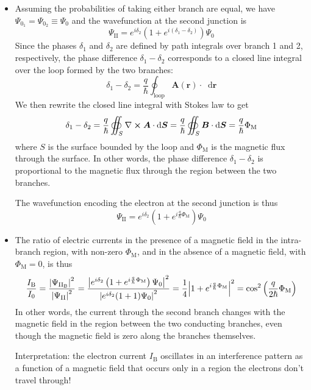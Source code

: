 \documentclass[11pt, a4paper]{article}
\newcommand{\diff}{\mathop{}\!\mathrm{d}} %
\renewcommand{\curl}{\nabla \cross}
\renewcommand{\vec}[1]{\bm{#1}}  %
\renewcommand{\r}{\vec{r}}  %
\newcommand{\A}{\vec{A}}  %
\newcommand{\B}{\vec{B}}  %
\renewcommand{\P}{\Psi}  %
\begin{document}
\begin{itemize}
	\item Assuming the probabilities of taking either branch are equal, we have $ \P_{0_{1}} = \P_{0_{2}} \equiv \P_{0} $ and the wavefunction at the second junction is
	\begin{equation*}
		\P_{\text{II}} = e^{i\delta_{2}}\left(1 + e^{i(\delta_{1} - \delta_{2})}\right)\P_{0}
	\end{equation*}
	Since the phases $ \delta_{1} $ and $\delta_{2} $ are defined by path integrals over branch 1 and 2, respectively, the phase difference $ \delta_{1} - \delta_{2} $ corresponds to a closed line integral over the loop formed by the two branches:
	\begin{equation*}
		\delta_{1} - \delta_{2} = \frac{q}{\hbar} \oint_{\text{loop}} \A(\r) \cdot \diff \r
	\end{equation*}
	We then rewrite the closed line integral with Stokes law to get
	\begin{equation*}
		\delta_{1} - \delta_{2} = \frac{q}{\hbar} \oiint_{S}\curl \A \cdot \diff \vec{S} = \frac{q}{\hbar}\oiint_{S} \B \cdot \diff \vec{S} = \frac{q}{\hbar}\Phi_{\text{M}}
	\end{equation*}
	where $ S $ is the surface bounded by the loop and $ \Phi_{\text{M}} $ is the magnetic flux through the surface. In other words, the phase difference $ \delta_{1} - \delta_{2} $ is proportional to the magnetic flux through the region between the two branches.
	
	The wavefunction encoding the electron at the second junction is thus
	\begin{equation*}
		\P_{\text{II}} = e^{i\delta_{2}}\left(1 + e^{i\frac{q}{\hbar}\Phi_{\text{M}}}\right)\P_{0}
	\end{equation*}
	
	\item The ratio of electric currents in the presence of a magnetic field in the intra-branch region, with non-zero $ \Phi_{\text{M}} $, and in the absence of a magnetic field, with $ \Phi_{\text{M}} = 0 $, is thus
	\begin{equation*}
		\frac{I_{\text{B}}}{I_{0}} = \frac{\abs{\P_{\text{II}_{\text{B}}}}^{2}}{\abs{\P_{\text{II}}}^{2}} = \frac{\abs{e^{i\delta_{2}}\left(1 + e^{i\frac{q}{\hbar}\Phi_{\text{M}}}\right)\P_{0}}^{2}}{\abs{e^{i\delta_{2}}(1 + 1)\P_{0}}^{2}} = \frac{1}{4}\abs{1 + e^{i\frac{q}{\hbar}\Phi_{\text{M}}}}^{2} = \cos^{2}\left(\frac{q}{2\hbar}\Phi_{\text{M}}\right)
	\end{equation*}
	In other words, the current through the second branch changes with the magnetic field in the region between the two conducting branches, even though the magnetic field is zero along the branches themselves. 
	
	Interpretation: the electron current $ I_{\text{B}} $ oscillates in an interference pattern as a function of a magnetic field that occurs only in a region the electrons don't travel through!
\end{itemize}
\end{document}
